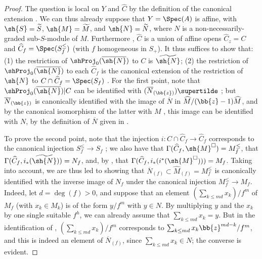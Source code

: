 \begin{proof}
The question is local on $Y$ and $\widehat{C}$ by the definition of the canonical extension .
We can thus already suppose that $Y=\Spec(A)$ is affine, with $\sh{S}=\widetilde{S}$, $\sh{M}=\widetilde{M}$, and $\sh{N}=\widetilde{N}$, where $N$ is a non-necessarily-graded sub-$S$-module of $M$.
Furthermore , $\widehat{C}$ is a union of affine opens $\widehat{C}_z=C$ and $\widehat{C}_f=\Spec(S_f^\leq)$ (with $f$ homogeneous in $S_+$).
It thus suffices to show that: (1) the restriction of $\shProj_0(\overline{\sh{N}})$ to $C$ is $\widetilde{\sh{N}}$; (2) the restriction of $\shProj_0(\overline{\sh{N}})$ to each $\widehat{C}_f$ is the canonical extension of the restriction of $\sh{N}$ to $C\cap\widehat{C}_f=\Spec(S_f)$ .
For the first point, note that $\shProj_0(\overline{\sh{N}})|C$ can be identified with $(\overline{N}_{(\bb{z})})\supertilde$ ;
but $\overline{N}_{(\bb{z})}$ is canonically identified  with the image of $\overline{N}$ in $\widehat{M}/(\bb{z}-1)\widehat{M}$, and by the canonical isomorphism of the latter with $M$ , this image can be identified with $N$, by the definition of $\overline{N}$ given in .

To prove the second point, note that the injection $i:C\cap\widehat{C}_f\to\widehat{C}_f$ corresponds to the canonical injection $S_f^\leq\to S_f$ ;
we also have that $\Gamma(\widehat{C}_f,\sh{M}^\square)=M_f^\leq$, that $\Gamma(\widehat{C}_f,i_*(\widetilde{\sh{N}}))=N_f$, and, by , that $\Gamma(\widehat{C}_f,i_*(i^*(\sh{M}^\square)))=M_f$.
Taking  into account, we are thus led to showing that $\overline{N}_{(f)}\subset\widehat{M}_{(f)}=M_f^\leq$ is canonically identified with the inverse image of $N_f$ under the canonical injection $M_f^\leq\to M_f$.
Indeed, let $d=\deg(f)>0$, and suppose that an element $(\sum_{k\leq md}x_k)/f^m$ of $M_f$ (with $x_k\in M_k$) is of the form $y/f^m$ with $y\in N$.
By multiplying $y$ and the $x_k$ by one single suitable $f^h$, we can already assume that $\sum_{k\leq md}x_k=y$.
But in the identification of , $(\sum_{k\leq md}x_k)/f^m$ corresponds to $\sum_{k\leq md}x_k\bb{z}^{md-k}/f^m$, and this is indeed an element of $\overline{N}_{(f)}$, since $\sum_{k\leq md}x_k\in N$;
the converse is evident.
\end{proof}

